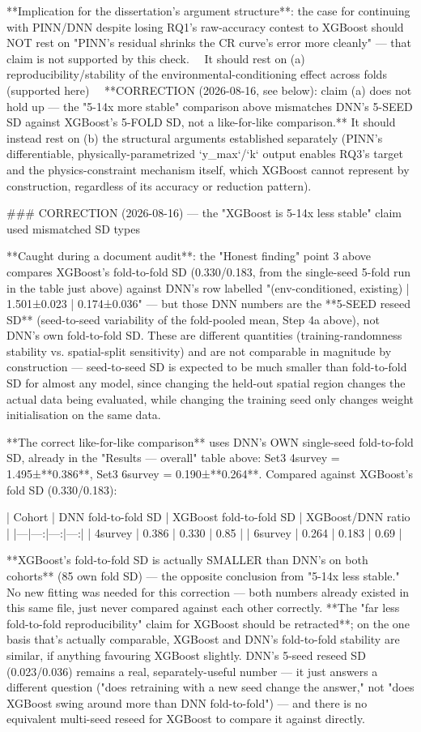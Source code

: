 **Implication for the dissertation's argument structure**: the case for continuing with PINN/DNN
despite losing RQ1's raw-accuracy contest to XGBoost should NOT rest on "PINN's residual shrinks
the CR curve's error more cleanly" — that claim is not supported by this check. ~~It should rest on
(a) reproducibility/stability of the environmental-conditioning effect across folds (supported
here)~~ **CORRECTION (2026-08-16, see below): claim (a) does not hold up — the "5-14x more stable"
comparison above mismatches DNN's 5-SEED SD against XGBoost's 5-FOLD SD, not a like-for-like
comparison.** It should instead rest on (b) the structural arguments established separately
(PINN's differentiable, physically-parametrized `y_max`/`k` output enables RQ3's target and the
physics-constraint mechanism itself, which XGBoost cannot represent by construction, regardless of
its accuracy or reduction pattern).

### CORRECTION (2026-08-16) — the "XGBoost is 5-14x less stable" claim used mismatched SD types

**Caught during a document audit**: the "Honest finding" point 3 above compares XGBoost's
fold-to-fold SD (0.330/0.183, from the single-seed 5-fold run in the table just above) against
DNN's row labelled "(env-conditioned, existing) | 1.501±0.023 | 0.174±0.036" — but those DNN
numbers are the **5-SEED reseed SD** (seed-to-seed variability of the fold-pooled mean, Step 4a
above), not DNN's own fold-to-fold SD. These are different quantities (training-randomness
stability vs. spatial-split sensitivity) and are not comparable in magnitude by construction —
seed-to-seed SD is expected to be much smaller than fold-to-fold SD for almost any model, since
changing the held-out spatial region changes the actual data being evaluated, while changing the
training seed only changes weight initialisation on the same data.

**The correct like-for-like comparison** uses DNN's OWN single-seed fold-to-fold SD, already in
the "Results — overall" table above: Set3 4survey = 1.495±**0.386**, Set3 6survey =
0.190±**0.264**. Compared against XGBoost's fold SD (0.330/0.183):

| Cohort | DNN fold-to-fold SD | XGBoost fold-to-fold SD | XGBoost/DNN ratio |
|---|---:|---:|---:|
| 4survey | 0.386 | 0.330 | 0.85 |
| 6survey | 0.264 | 0.183 | 0.69 |

**XGBoost's fold-to-fold SD is actually SMALLER than DNN's on both cohorts** (85%
own fold SD) — the opposite conclusion from "5-14x less stable." No new fitting was needed for this
correction — both numbers already existed in this same file, just never compared against each
other correctly. **The "far less fold-to-fold reproducibility" claim for XGBoost should be
retracted**; on the one basis that's actually comparable, XGBoost and DNN's fold-to-fold stability
are similar, if anything favouring XGBoost slightly. DNN's 5-seed reseed SD (0.023/0.036) remains a
real, separately-useful number — it just answers a different question ("does retraining with a new
seed change the answer," not "does XGBoost swing around more than DNN fold-to-fold") — and there is
no equivalent multi-seed reseed for XGBoost to compare it against directly.

